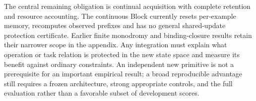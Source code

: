 The central remaining obligation is continual acquisition with complete
retention and resource accounting. The continuous Block currently resets
per-example memory, recomputes observed prefixes and has no general shared-update
protection certificate. Earlier finite monodromy and binding-closure results
retain their narrower scope in the appendix. Any integration must explain
what operation or task relation is protected in the new state space and
measure its benefit against ordinary constraints. An independent new primitive
is not a prerequisite for an important empirical result; a broad reproducible
advantage still requires a frozen architecture, strong appropriate controls,
and the full evaluation rather than a favorable subset of development scores.
